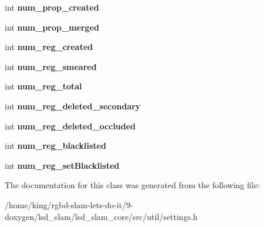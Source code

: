 \begin{DoxyCompactItemize}
\item 
\hypertarget{classlsd__slam_1_1_running_stats_a5f7e7a10b57ff2d46296544334cd482a}{int {\bfseries num\-\_\-prop\-\_\-created}}\label{classlsd__slam_1_1_running_stats_a5f7e7a10b57ff2d46296544334cd482a}

\item 
\hypertarget{classlsd__slam_1_1_running_stats_ac2fd244f93035dd6dae9fa9fd2f0226c}{int {\bfseries num\-\_\-prop\-\_\-merged}}\label{classlsd__slam_1_1_running_stats_ac2fd244f93035dd6dae9fa9fd2f0226c}

\item 
\hypertarget{classlsd__slam_1_1_running_stats_aa41869769a3d82877c0bdf425af1a384}{int {\bfseries num\-\_\-reg\-\_\-created}}\label{classlsd__slam_1_1_running_stats_aa41869769a3d82877c0bdf425af1a384}

\item 
\hypertarget{classlsd__slam_1_1_running_stats_a132a07db925c925c01464fc175027255}{int {\bfseries num\-\_\-reg\-\_\-smeared}}\label{classlsd__slam_1_1_running_stats_a132a07db925c925c01464fc175027255}

\item 
\hypertarget{classlsd__slam_1_1_running_stats_ae6f37135e51264476d82c5616b1339d4}{int {\bfseries num\-\_\-reg\-\_\-total}}\label{classlsd__slam_1_1_running_stats_ae6f37135e51264476d82c5616b1339d4}

\item 
\hypertarget{classlsd__slam_1_1_running_stats_aa5ec07e003468dcf5b9baaa00976e5b8}{int {\bfseries num\-\_\-reg\-\_\-deleted\-\_\-secondary}}\label{classlsd__slam_1_1_running_stats_aa5ec07e003468dcf5b9baaa00976e5b8}

\item 
\hypertarget{classlsd__slam_1_1_running_stats_a6a7921e214fe4b46d7252444c9f66f6b}{int {\bfseries num\-\_\-reg\-\_\-deleted\-\_\-occluded}}\label{classlsd__slam_1_1_running_stats_a6a7921e214fe4b46d7252444c9f66f6b}

\item 
\hypertarget{classlsd__slam_1_1_running_stats_ad8daea4f289e4929b82d4f6fb1632c04}{int {\bfseries num\-\_\-reg\-\_\-blacklisted}}\label{classlsd__slam_1_1_running_stats_ad8daea4f289e4929b82d4f6fb1632c04}

\item 
\hypertarget{classlsd__slam_1_1_running_stats_ac3f1446413cb96241a1621ccd935306b}{int {\bfseries num\-\_\-reg\-\_\-set\-Blacklisted}}\label{classlsd__slam_1_1_running_stats_ac3f1446413cb96241a1621ccd935306b}

\end{DoxyCompactItemize}


The documentation for this class was generated from the following file\-:\begin{DoxyCompactItemize}
\item 
/home/king/rgbd-\/slam-\/lets-\/do-\/it/9-\/doxygen/lsd\-\_\-slam/lsd\-\_\-slam\-\_\-core/src/util/settings.\-h\end{DoxyCompactItemize}

